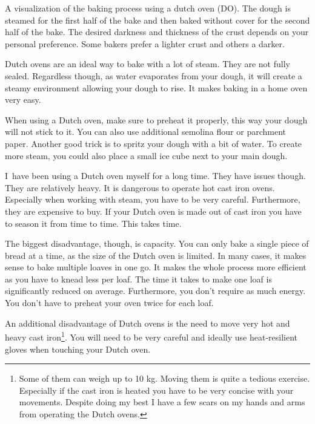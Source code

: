 \begin{flowchart}[!htb]
\centering
  
  \caption[Baking process with a dutch oven]{A visualization of the baking
      process using a dutch oven (DO). The dough is steamed for the first half
      of the bake and then baked without cover for the second half of the
      bake. The desired darkness and thickness of the crust depends on your
      personal preference. Some bakers prefer a lighter crust and others a
      darker.}%
  \label{fig:dutch-oven-process}
\end{flowchart}

Dutch ovens are an ideal way to bake with a lot of
steam. They are not fully sealed. Regardless though,
as water evaporates from your dough, it will create a steamy
environment allowing your dough to rise. It
makes baking in a home oven very easy.

When using a Dutch oven, make sure to preheat it properly,
this way your dough will not stick to it. You can also
use additional semolina flour or parchment paper. Another
good trick is to spritz your dough with a bit of water.
To create more steam, you could also place a small ice cube
next to your main dough.

I~have been using a Dutch oven myself for a long time. They
have issues though. They are relatively heavy. It is dangerous
to operate hot cast iron ovens. Especially when working with steam,
you have to be very careful. Furthermore,
they are expensive to buy. If your Dutch oven is made out
of cast iron you have to season it from time to time. This takes
time.

The biggest disadvantage, though, is
capacity. You can only bake a single piece of bread at a time,
as the size of the Dutch oven is limited.
In many cases, it makes sense to bake multiple
loaves in one go. It makes the whole process more
efficient as you have to knead less per loaf. The time it
takes to make one loaf is significantly reduced on average. Furthermore,
you don't require as much energy. You don't have
to preheat your oven twice for each loaf.

An additional disadvantage of Dutch ovens is the
need to move very hot and heavy cast iron\footnote{%
  Some of them can weigh up to 10 kg. Moving them is quite
  a tedious exercise. Especially if the cast iron is
  heated you have to be very concise with your movements.
  Despite doing my best I have a few scars on my
  hands and arms from operating the Dutch ovens.
}.
You will need to be very careful and ideally use
heat-resilient gloves when touching your Dutch oven.

